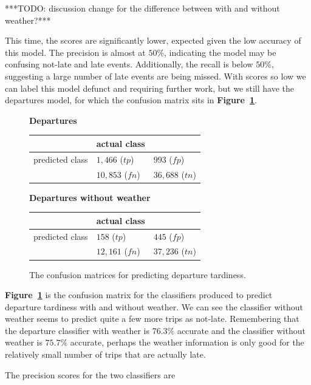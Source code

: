 \documentclass[11pt]{article} %
\begin{document}
***TODO: discussion change for the difference between with and without weather?***

This time, the scores are significantly lower, expected given the low accuracy
of this model. The precision is almost at $50\%$, indicating the model may be
confusing not-late and late events. Additionally, the recall is below 
$50\%$, suggesting a large number of late events are being missed. With scores
so low we can label this model defunct and requiring further work, but
we still have the departures model, for which the confusion matrix sits in
\textbf{Figure~\ref{fig:confusion_departures}}.


\begin{figure}
    \textbf{Departures}

    \begin{tabular}[h]{l|ll}
                         & actual class &  \\
         \hline
         predicted class & $1,466$ ($tp$)& $993$ ($fp$)\\
                         & $10,853$ ($fn$)& $36,688$ ($tn$)\\
    \end{tabular}

    \textbf{Departures without weather}

    \begin{tabular}[h]{l|ll}
                         & actual class &  \\
         \hline
         predicted class & $158$ ($tp$)& $445$ ($fp$)\\
                         & $12,161$ ($fn$)& $37,236$ ($tn$)\\
    \end{tabular}
    \caption{The confusion matrices for predicting departure tardiness.}
    \label{fig:confusion_departures}
\end{figure}

\textbf{Figure~\ref{fig:confusion_departures}} is the confusion matrix for the 
classifiers produced to predict departure tardiness with and without weather. 
We can see the classifier without weather seems to predict quite a few more trips 
as not-late. Remembering that the departure classifier with weather is $76.3\%$ 
accurate and the classifier without weather is $75.7\%$ accurate, perhaps the
weather information is only good for the relatively small number of trips that 
are actually late. 

The precision scores for the two classifiers are
\end{document}
